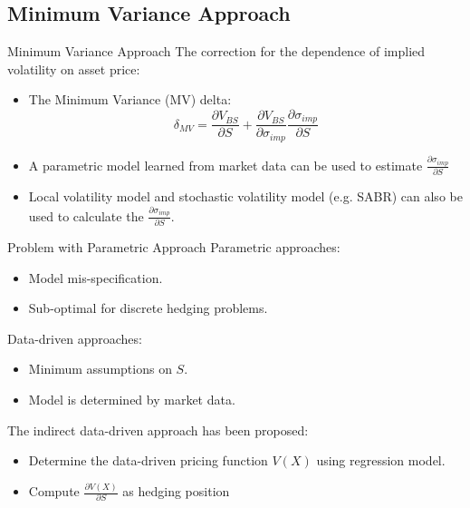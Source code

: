 \documentclass[10pt,table,mathserif]{beamer}
\begin{document}
\subsection{Minimum Variance Approach}
\begin{frame}{Minimum Variance Approach}
The correction for  the dependence of implied volatility on asset price:
\begin{itemize}
	\item The Minimum Variance (MV) delta:
	\[
	\delta_{MV}=\frac{\partial V_{BS}}{\partial S}+\frac{\partial V_{BS}}{\partial \sigma_{imp}}\frac{\partial \sigma_{imp}}{ \partial S}
	\]
	\item  A parametric model \footnotemark learned from market data can be used to estimate $\frac{\partial \sigma_{imp}}{ \partial S}$
	\item Local volatility model and stochastic volatility model (e.g. SABR)  can also be used to calculate the $\frac{\partial \sigma_{imp}}{ \partial S}$.
\end{itemize}
\end{frame}


\begin{frame}{Problem with Parametric Approach}
Parametric approaches:
\begin{itemize}
	\item Model mis-specification.
	\item Sub-optimal for discrete hedging problems.
\end{itemize}

Data-driven approaches:
\begin{itemize}
	\item Minimum assumptions on $S$.
	\item Model is determined by market data.
\end{itemize}

The indirect data-driven approach \footnotemark has been proposed:
\begin{itemize}
	\item Determine the data-driven pricing function $V(X)$ using regression model.
	\item Compute $\frac{ \partial V(X) }{ \partial S}$ as hedging position
\end{itemize}
\end{frame}
\end{document}
